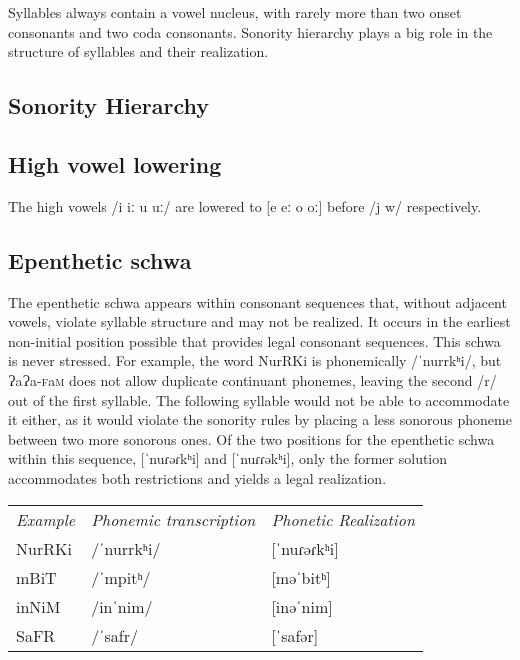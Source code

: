 \documentclass[a4paper,10pt,twoside,openright]{memoir}
\newcommand{\lang}{{\bigglot}a{\bigglot}a-\textsc{f}a\textsc{m}}
\newcommand{\longv}{ː}
\newcommand{\bigglot}{Ɂ}
\newcommand\famword[1]{{\addfontfeatures{Letters=UppercaseSmallCaps}#1}}
\begin{document}
Syllables always contain a vowel nucleus, with rarely more than two onset consonants and two coda consonants. Sonority hierarchy plays a big role in the structure of syllables and their realization.

\subsection{Sonority Hierarchy}
\subsection{High vowel lowering}

The high vowels /i i\longv{} u u\longv/ are lowered to [e e\longv{} o o\longv{}] before /j w/ respectively.

\subsection{Epenthetic schwa}

The epenthetic schwa appears within consonant sequences that, without adjacent vowels, violate syllable structure and may not be realized. It occurs in the earliest non-initial position possible that provides legal consonant sequences. This schwa is never stressed. For example, the word \famword{NurRKi} is phonemically /ˈnurrkʰi/, but \lang{} does not allow duplicate continuant phonemes, leaving the second /r/ out of the first syllable. The following syllable would not be able to accommodate it either, as it would violate the sonority rules by placing a less sonorous phoneme between two more sonorous ones. Of the two positions for the epenthetic schwa within this sequence, [ˈnuɾəɾkʰi] and [ˈnuɾɾəkʰi], only the former solution accommodates both restrictions and yields a legal realization.

\begin{table}[ht]
    \begin{tabular}{lll}
        \textit{Example}    & \textit{Phonemic transcription}   & \textit{Phonetic Realization} \\
        \famword{NurRKi}    & /ˈnurrkʰi/                        & [ˈnuɾəɾkʰi] \\
        \famword{mBiT}      & /ˈmpitʰ/                          & [məˈbitʰ] \\
        \famword{inNiM}     & /inˈnim/                          & [inəˈnim] \\
        \famword{SaFR}      & /ˈsafr/                           & [ˈsafər] 
    \end{tabular}
\end{table}
\end{document}
